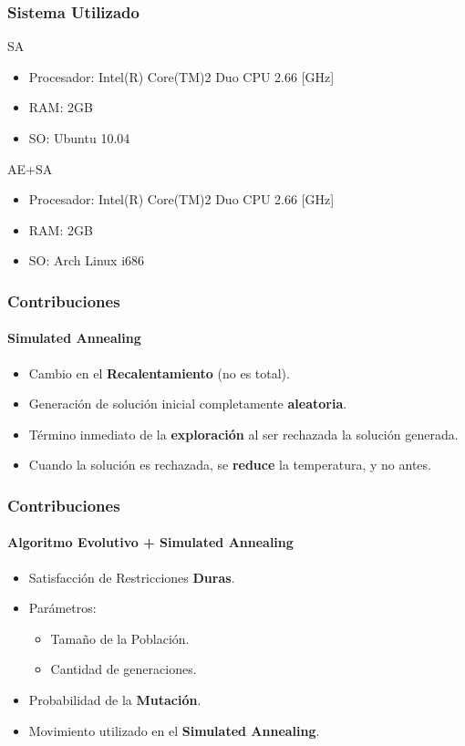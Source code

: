 \frame
{
\frametitle{Sistema Utilizado}
\begin{block}{SA}
\begin{itemize}
	\item Procesador: Intel(R) Core(TM)2 Duo CPU 2.66 [GHz]
	\item RAM: 2GB
	\item SO: Ubuntu 10.04
\end{itemize}
\end{block}

\begin{block}{AE+SA}
\begin{itemize}
	\item Procesador: Intel(R) Core(TM)2 Duo CPU 2.66 [GHz]
	\item RAM: 2GB
	\item SO: Arch Linux i686
\end{itemize}
\end{block}
}



\frame
{
\frametitle{Contribuciones}
\framesubtitle{Simulated Annealing}
\begin{itemize}
	\item Cambio en el {\bf Recalentamiento} (no es total).
	\item Generación de solución inicial completamente {\bf aleatoria}.
	\item Término inmediato de la {\bf exploración} al ser rechazada la solución generada.
	\item Cuando la solución es rechazada, se {\bf reduce} la temperatura, y no antes.
\end{itemize}
}
\frame
{
\frametitle{Contribuciones}
\framesubtitle{Algoritmo Evolutivo + Simulated Annealing}
\begin{itemize}
	\item Satisfacción de Restricciones {\bf Duras}.
	\item Parámetros:
	 \begin{itemize}
	 	\item Tamaño de la Población.
		\item Cantidad de generaciones.
	 \end{itemize}
	\item Probabilidad de la {\bf Mutación}.
	\item Movimiento utilizado en el {\bf Simulated Annealing}.
\end{itemize}
}
